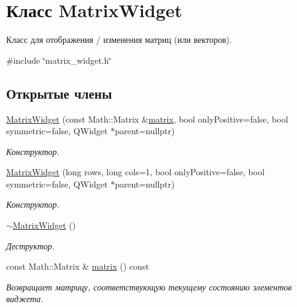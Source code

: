 \hypertarget{class_matrix_widget}{}\section{Класс Matrix\+Widget}
\label{class_matrix_widget}


Класс для отображения / изменения матриц (или векторов).  




{\ttfamily \#include \char`\"{}matrix\+\_\+widget.\+h\char`\"{}}

\subsection*{Открытые члены}
\begin{DoxyCompactItemize}
\item 
\hyperlink{class_matrix_widget_a127414cc00d40d2b62721bcf49286c89}{Matrix\+Widget} (const Math\+::\+Matrix \&\hyperlink{class_matrix_widget_a058562ee7f6d3e1e5671514a39899e3a}{matrix}, bool only\+Positive=false, bool symmetric=false, Q\+Widget $\ast$parent=nullptr)
\begin{DoxyCompactList}\small\item\em Конструктор. \end{DoxyCompactList}\item 
\hyperlink{class_matrix_widget_a3eb9219f9cf1bd7e9569a2557cafbf91}{Matrix\+Widget} (long rows, long cols=1, bool only\+Positive=false, bool symmetric=false, Q\+Widget $\ast$parent=nullptr)
\begin{DoxyCompactList}\small\item\em Конструктор. \end{DoxyCompactList}\item 
\hypertarget{class_matrix_widget_a64970508bea25f769ea0e8884985a490}{}\label{class_matrix_widget_a64970508bea25f769ea0e8884985a490} 
\hyperlink{class_matrix_widget_a64970508bea25f769ea0e8884985a490}{$\sim$\+Matrix\+Widget} ()
\begin{DoxyCompactList}\small\item\em Деструктор. \end{DoxyCompactList}\item 
\hypertarget{class_matrix_widget_a058562ee7f6d3e1e5671514a39899e3a}{}\label{class_matrix_widget_a058562ee7f6d3e1e5671514a39899e3a} 
const Math\+::\+Matrix \& \hyperlink{class_matrix_widget_a058562ee7f6d3e1e5671514a39899e3a}{matrix} () const
\begin{DoxyCompactList}\small\item\em Возвращает матрицу, соответствующую текущему состоянию элементов виджета. \end{DoxyCompactList}\end{DoxyCompactItemize}
